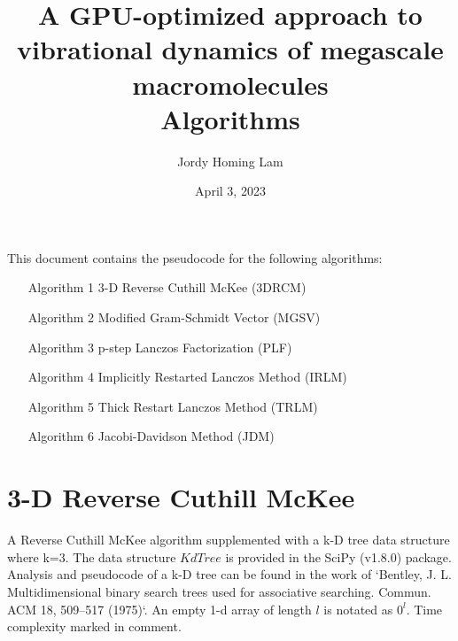 \documentclass[a4paper]{article}
\title{A GPU-optimized approach to vibrational dynamics of megascale macromolecules \protect\\ Algorithms \protect\\}
\author{Jordy Homing Lam}
\date{April 3, 2023}
\begin{document}
\maketitle

This document contains the pseudocode for the following algorithms:
\begin{itemize}
\item [Algorithm 1] 3-D Reverse Cuthill McKee (3DRCM)
\item [Algorithm 2] Modified Gram-Schmidt Vector (MGSV)
\item [Algorithm 3] p-step Lanczos Factorization (PLF)
\item [Algorithm 4] Implicitly Restarted Lanczos Method (IRLM)
\item [Algorithm 5] Thick Restart Lanczos Method (TRLM)
\item [Algorithm 6] Jacobi-Davidson Method (JDM)
\end{itemize}











\pagebreak







\section{3-D Reverse Cuthill McKee}

A Reverse Cuthill McKee algorithm supplemented with a k-D tree data structure where k=3. The data structure $KdTree$ is provided in the SciPy (v1.8.0) package. Analysis and pseudocode of a k-D tree can be found in the work of `Bentley, J. L. Multidimensional binary search trees used for associative searching. Commun. ACM 18, 509–517 (1975)`. An empty 1-d array of length $l$ is notated as $0^l$. Time complexity marked in comment.
\end{document}
